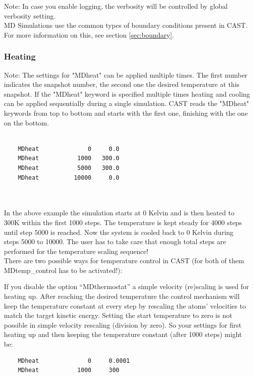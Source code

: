 \documentclass[10pt,a4paper]{article} %
\begin{document}
	Note: In case you enable logging, the verbosity will be controlled by global verbosity setting.\\
	
	\ac{MD} Simulations use the common types of boundary conditions present in \ac{CAST}. For more information on this, see section \ref{sec:boundary}.

	\subsubsection{Heating}
	Note: The settings for "MDheat" can be applied multiple times. The first number indicates the snapshot number, the second one the desired temperature at this snapshot. If the "MDheat" keyword is specified multiple times heating and cooling can be applied sequentially during a single simulation. \ac{CAST} reads the "MDheat" keywords from top to bottom and starts with the first one, finishing with the one on the bottom.\\~\\
	\begin{lstlisting}
	MDheat			    0  	  0.0
	MDheat 			 1000   300.0
	MDheat			 5000   300.0
	MDheat			10000     0.0
	\end{lstlisting}~\\~\\
	In the above example the simulation starts at 0 Kelvin and is then heated to 300K within the first 1000 steps. The temperature is kept steady for 4000 steps until step 5000 is reached. Now the system is cooled back to 0 Kelvin during steps 5000 to 10000. The user has to take care that enough total steps are performed for the temperature scaling sequence!\\
	
	There are two possible ways for temperature control in CAST (for both of them MDtemp\_control has to be activated!): 

	If you disable the option ``MDthermostat'' a simple velocity (re)scaling is used for heating up. After reaching the desired temperature the control mechanism will keep the temperature constant at every step by rescaling the atoms' velocities to match the target kinetic energy. Setting the start temperature to zero is not possible in simple velocity rescaling (division by zero). So your settings for first heating up and then keeping the temperature constant (after 1000 steps) might be:
	\begin{lstlisting}
	MDheat			    0  	  0.0001
	MDheat 			 1000     300
	\end{lstlisting}
\end{document}
